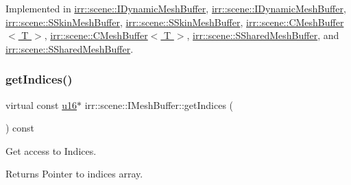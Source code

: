 Implemented in \hyperlink{classirr_1_1scene_1_1IDynamicMeshBuffer_ab762d23eb5666125dad83ce20f15b4dd}{irr\+::scene\+::\+I\+Dynamic\+Mesh\+Buffer}, \hyperlink{classirr_1_1scene_1_1IDynamicMeshBuffer_ab762d23eb5666125dad83ce20f15b4dd}{irr\+::scene\+::\+I\+Dynamic\+Mesh\+Buffer}, \hyperlink{structirr_1_1scene_1_1SSkinMeshBuffer_ac5f16b3fca6454afe01939a2c1e23d08}{irr\+::scene\+::\+S\+Skin\+Mesh\+Buffer}, \hyperlink{structirr_1_1scene_1_1SSkinMeshBuffer_ac5f16b3fca6454afe01939a2c1e23d08}{irr\+::scene\+::\+S\+Skin\+Mesh\+Buffer}, \hyperlink{classirr_1_1scene_1_1CMeshBuffer_a23af7e8ffb2ba674d1dd4448cea288bf}{irr\+::scene\+::\+C\+Mesh\+Buffer$<$ T $>$}, \hyperlink{classirr_1_1scene_1_1CMeshBuffer_a23af7e8ffb2ba674d1dd4448cea288bf}{irr\+::scene\+::\+C\+Mesh\+Buffer$<$ T $>$}, \hyperlink{structirr_1_1scene_1_1SSharedMeshBuffer_a3ddd96966e9bbb409536dd8951018b69}{irr\+::scene\+::\+S\+Shared\+Mesh\+Buffer}, and \hyperlink{structirr_1_1scene_1_1SSharedMeshBuffer_a3ddd96966e9bbb409536dd8951018b69}{irr\+::scene\+::\+S\+Shared\+Mesh\+Buffer}.

\mbox{\label{classirr_1_1scene_1_1IMeshBuffer_a76c0013378012af7aeb6cb8f4ea8f9a1}} 
\subsubsection{\texorpdfstring{get\+Indices()}{getIndices()}\hspace{0.1cm}{\footnotesize\ttfamily [2/4]}}
{\footnotesize\ttfamily virtual const \hyperlink{namespaceirr_ae9f8ec82692ad3b83c21f555bfa70bcc}{u16}$\ast$ irr\+::scene\+::\+I\+Mesh\+Buffer\+::get\+Indices (\begin{DoxyParamCaption}{ }\end{DoxyParamCaption}) const\hspace{0.3cm}{\ttfamily [pure virtual]}}



Get access to Indices. 

\begin{DoxyReturn}{Returns}
Pointer to indices array. 
\end{DoxyReturn}


